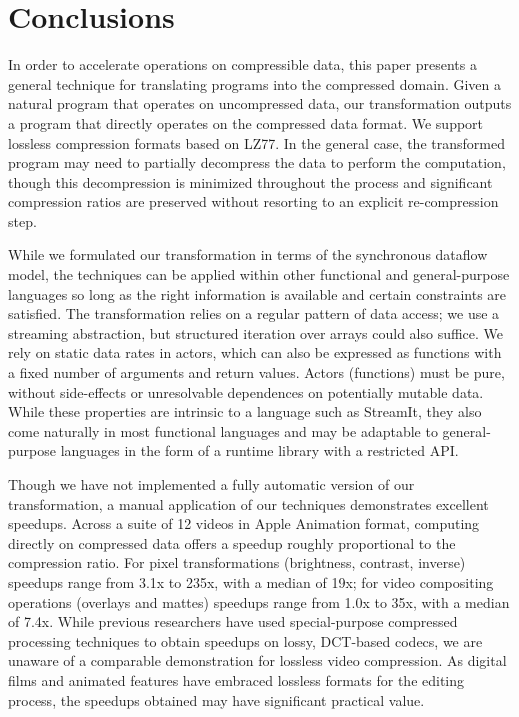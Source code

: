 \section{Conclusions}
\label{sec:conclusions}


In order to accelerate operations on compressible data, this paper
presents a general technique for translating programs into the
compressed domain.  Given a natural program that operates on
uncompressed data, our transformation outputs a program that directly
operates on the compressed data format.  We support lossless
compression formats based on LZ77.  In the general case, the
transformed program may need to partially decompress the data to
perform the computation, though this decompression is minimized
throughout the process and significant compression ratios are
preserved without resorting to an explicit re-compression step.

While we formulated our transformation in terms of the synchronous
dataflow model, the techniques can be applied within other functional
and general-purpose languages so long as the right information is
available and certain constraints are satisfied.  The transformation
relies on a regular pattern of data access; we use a streaming
abstraction, but structured iteration over arrays could also suffice.
We rely on static data rates in actors, which can also be expressed as
functions with a fixed number of arguments and return values.  Actors
(functions) must be pure, without side-effects or unresolvable
dependences on potentially mutable data.  While these properties are
intrinsic to a language such as StreamIt, they also come naturally in
most functional languages and may be adaptable to general-purpose
languages in the form of a runtime library with a restricted API.

Though we have not implemented a fully automatic version of our
transformation, a manual application of our techniques demonstrates
excellent speedups.  Across a suite of 12 videos in Apple Animation
format, computing directly on compressed data offers a speedup roughly
proportional to the compression ratio.  For pixel transformations
(brightness, contrast, inverse) speedups range from 3.1x to 235x, with
a median of 19x; for video compositing operations (overlays and
mattes) speedups range from 1.0x to 35x, with a median of 7.4x.  While
previous researchers have used special-purpose compressed processing
techniques to obtain speedups on lossy, DCT-based codecs, we are
unaware of a comparable demonstration for lossless video compression.
As digital films and animated features have embraced lossless formats
for the editing process, the speedups obtained may have significant
practical value.